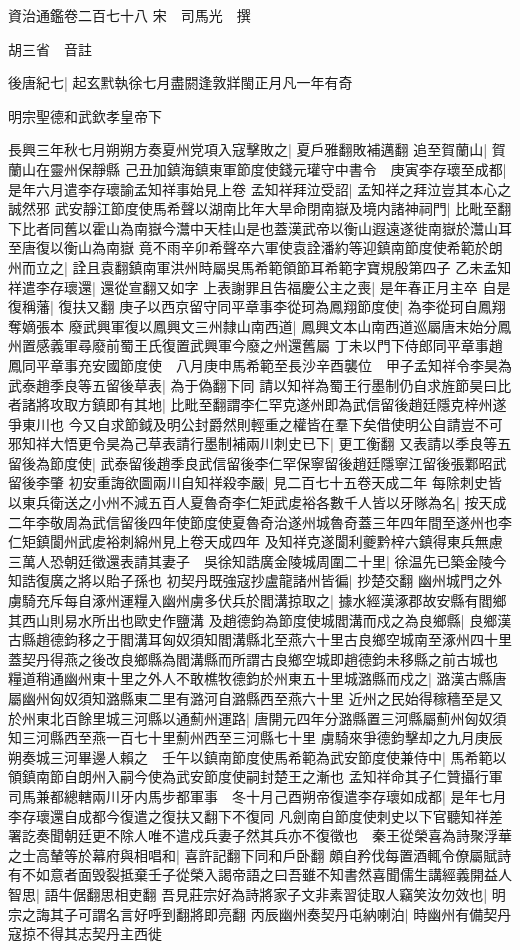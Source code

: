 資治通鑑卷二百七十八
宋　司馬光　撰

胡三省　音註

後唐紀七|{
	起玄黓執徐七月盡閼逢敦牂閩正月凡一年有奇}


明宗聖德和武欽孝皇帝下

長興三年秋七月朔朔方奏夏州党項入寇擊敗之|{
	夏戶雅翻敗補邁翻}
追至賀蘭山|{
	賀蘭山在靈州保靜縣}
己丑加鎮海鎮東軍節度使錢元瓘守中書令　庚寅李存瓌至成都|{
	是年六月遣李存瓌諭孟知祥事始見上卷}
孟知祥拜泣受詔|{
	孟知祥之拜泣豈其本心之誠然邪}
武安靜江節度使馬希聲以湖南比年大旱命閉南嶽及境内諸神祠門|{
	比毗至翻下比者同舊以霍山為南嶽今灊中天桂山是也蓋漢武帝以衡山遐遠遂徙南嶽於灊山耳至唐復以衡山為南嶽}
竟不雨辛卯希聲卒六軍使袁詮潘約等迎鎮南節度使希範於朗州而立之|{
	詮且袁翻鎮南軍洪州時屬吳馬希範領節耳希範字寶規殷第四子}
乙未孟知祥遣李存瓌還|{
	還從宣翻又如字}
上表謝罪且告福慶公主之喪|{
	是年春正月主卒}
自是復稱藩|{
	復扶又翻}
庚子以西京留守同平章事李從珂為鳳翔節度使|{
	為李從珂自鳳翔奪嫡張本}
廢武興軍復以鳳興文三州隸山南西道|{
	鳳興文本山南西道巡屬唐末始分鳳州置感義軍尋廢前蜀王氏復置武興軍今廢之州還舊屬}
丁未以門下侍郎同平章事趙鳳同平章事充安國節度使　八月庚申馬希範至長沙辛酉襲位　甲子孟知祥令李昊為武泰趙季良等五留後草表|{
	為于偽翻下同}
請以知祥為蜀王行墨制仍自求旌節昊曰比者諸將攻取方鎮即有其地|{
	比毗至翻謂李仁罕克遂州即為武信留後趙廷隱克梓州遂爭東川也}
今又自求節鉞及明公封爵然則輕重之權皆在羣下矣借使明公自請豈不可邪知祥大悟更令昊為己草表請行墨制補兩川刺史已下|{
	更工衡翻}
又表請以季良等五留後為節度使|{
	武泰留後趙季良武信留後李仁罕保寧留後趙廷隱寧江留後張鄴昭武留後李肇}
初安重誨欲圖兩川自知祥殺李嚴|{
	見二百七十五卷天成二年}
每除刺史皆以東兵衛送之小州不減五百人夏魯奇李仁矩武䖍裕各數千人皆以牙隊為名|{
	按天成二年李敬周為武信留後四年使節度使夏魯奇治遂州城魯奇蓋三年四年間至遂州也李仁矩鎮閬州武䖍裕刺綿州見上卷天成四年}
及知祥克遂閬利夔黔梓六鎮得東兵無慮三萬人恐朝廷徵還表請其妻子　吳徐知誥廣金陵城周圍二十里|{
	徐温先已築金陵今知誥復廣之將以貽子孫也}
初契丹既強寇抄盧龍諸州皆徧|{
	抄楚交翻}
幽州城門之外虜騎充斥每自涿州運糧入幽州虜多伏兵於閻溝掠取之|{
	據水經漢涿郡故安縣有閻鄉其西山則易水所出也歐史作鹽溝}
及趙德鈞為節度使城閻溝而戍之為良鄉縣|{
	良鄉漢古縣趙德鈞移之于閻溝耳匈奴須知閻溝縣北至燕六十里古良鄉空城南至涿州四十里蓋契丹得燕之後改良鄉縣為閻溝縣而所謂古良鄉空城即趙德鈞未移縣之前古城也}
糧道稍通幽州東十里之外人不敢樵牧德鈞於州東五十里城潞縣而戍之|{
	潞漢古縣唐屬幽州匈奴須知潞縣東二里有潞河自潞縣西至燕六十里}
近州之民始得稼穡至是又於州東北百餘里城三河縣以通薊州運路|{
	唐開元四年分潞縣置三河縣屬薊州匈奴須知三河縣西至燕一百七十里薊州西至三河縣七十里}
虜騎來爭德鈞擊却之九月庚辰朔奏城三河畢邊人賴之　壬午以鎮南節度使馬希範為武安節度使兼侍中|{
	馬希範以領鎮南節自朗州入嗣今使為武安節度使嗣封楚王之漸也}
孟知祥命其子仁贊攝行軍司馬兼都總轄兩川牙内馬步都軍事　冬十月己酉朔帝復遣李存瓌如成都|{
	是年七月李存瓌還自成都今復遣之復扶又翻下不復同}
凡劍南自節度使刺史以下官聽知祥差署訖奏聞朝廷更不除人唯不遣戍兵妻子然其兵亦不復徵也　秦王從榮喜為詩聚浮華之士高輦等於幕府與相唱和|{
	喜許記翻下同和戶卧翻}
頗自矜伐每置酒輒令僚屬賦詩有不如意者面毁裂抵棄壬子從榮入謁帝語之曰吾雖不知書然喜聞儒生講經義開益人智思|{
	語牛倨翻思相吏翻}
吾見莊宗好為詩將家子文非素習徒取人竊笑汝勿效也|{
	明宗之誨其子可謂名言好呼到翻將即亮翻}
丙辰幽州奏契丹屯納喇泊|{
	時幽州有備契丹寇掠不得其志契丹主西徙}


